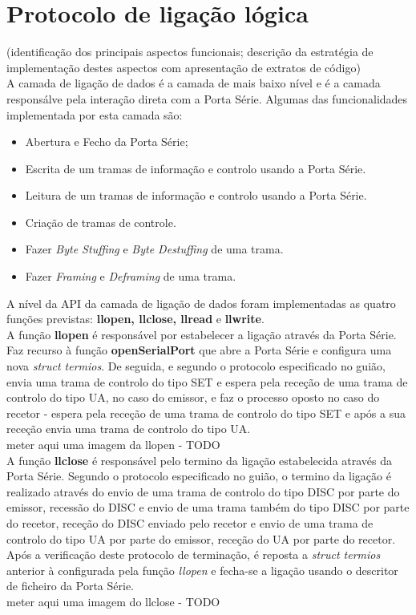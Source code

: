 \documentclass[a4paper, 11pt]{article}
\begin{document}
\section{Protocolo de ligação lógica}

 (identificação dos principais aspectos funcionais; descrição da estratégia de implementação destes aspectos com apresentação de extratos de código)\\
 
 A camada de ligação de dados é a camada de mais baixo nível e é a camada responsálve pela interação direta com a Porta Série. Algumas das funcionalidades implementada por esta camada são:
\begin{itemize}
	\item Abertura e Fecho da Porta Série;
	\item Escrita de um tramas de informação e controlo usando a Porta Série.
	\item Leitura de um tramas de informação e controlo usando a Porta Série.
	\item Criação de tramas de controle.
	\item Fazer \textit{Byte Stuffing} e \textit{Byte Destuffing} de uma trama.
	\item Fazer \textit{Framing } e \textit{Deframing} de uma trama.
\end{itemize}

A nível da API da camada de ligação de dados foram implementadas as quatro funções previstas: \textbf{llopen, llclose, llread} e \textbf{llwrite}.\\

A função \textbf{llopen} é responsável por estabelecer a ligação através da Porta Série. Faz recurso à função \textbf{openSerialPort} que abre a Porta Série e configura uma nova \textit{struct termios}. De seguida, e segundo o protocolo especificado no guião, envia uma trama de controlo do tipo SET e espera pela receção de uma trama de controlo do tipo UA, no caso do emissor, e faz o processo oposto no caso do recetor - espera pela receção de uma trama de controlo do tipo SET e após a sua receção envia uma trama de controlo do tipo UA.\\
meter aqui uma imagem da llopen - TODO \\

A função \textbf{llclose} é responsável pelo termino da ligação estabelecida através da Porta Série. Segundo o protocolo especificado no guião, o termino da ligação é realizado através do envio de uma trama de controlo do tipo DISC por parte do emissor,  recessão do DISC e envio de uma trama também do tipo DISC por parte do recetor, receção do DISC enviado pelo recetor e envio de uma trama de controlo do tipo UA por parte do emissor, receção do UA por parte do recetor. Após a verificação deste protocolo de terminação, é reposta a \textit{struct termios} anterior à configurada pela função \textit{llopen} e fecha-se a ligação usando o descritor de ficheiro da Porta Série.\\
meter aqui uma imagem do llclose - TODO \\
\end{document}
